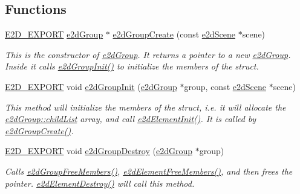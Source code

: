 \subsection*{Functions}
\begin{DoxyCompactItemize}
\item 
\hyperlink{Ez2DS_8h_a9f14e9cb869e1a85fdaba03afcca0df9}{E2\-D\-\_\-\-E\-X\-P\-O\-R\-T} \hyperlink{structe2dGroup}{e2d\-Group} $\ast$ \hyperlink{group__e2dGroup_ga3c7f6acf28180141c87806a9d260f3f9}{e2d\-Group\-Create} (const \hyperlink{structe2dScene}{e2d\-Scene} $\ast$scene)
\begin{DoxyCompactList}\small\item\em This is the constructor of \hyperlink{structe2dGroup}{e2d\-Group}. It returns a pointer to a new \hyperlink{structe2dGroup}{e2d\-Group}. Inside it calls \hyperlink{group__e2dGroup_gafa3f224a6509fbff5063dc910d4e3f1e}{e2d\-Group\-Init()} to initialize the members of the struct. \end{DoxyCompactList}\item 
\hyperlink{Ez2DS_8h_a9f14e9cb869e1a85fdaba03afcca0df9}{E2\-D\-\_\-\-E\-X\-P\-O\-R\-T} void \hyperlink{group__e2dGroup_gafa3f224a6509fbff5063dc910d4e3f1e}{e2d\-Group\-Init} (\hyperlink{structe2dGroup}{e2d\-Group} $\ast$group, const \hyperlink{structe2dScene}{e2d\-Scene} $\ast$scene)
\begin{DoxyCompactList}\small\item\em This method will initialize the members of the struct, i.\-e. it will allocate the \hyperlink{structe2dGroup_a55f6dde874716dc99dcd270fc0999a01}{e2d\-Group\-::child\-List} array, and call \hyperlink{group__e2dElement_ga8734d10ef40a380dfc51bfe1790a92a7}{e2d\-Element\-Init()}. It is called by \hyperlink{group__e2dGroup_ga3c7f6acf28180141c87806a9d260f3f9}{e2d\-Group\-Create()}. \end{DoxyCompactList}\item 
\hyperlink{Ez2DS_8h_a9f14e9cb869e1a85fdaba03afcca0df9}{E2\-D\-\_\-\-E\-X\-P\-O\-R\-T} void \hyperlink{group__e2dGroup_gae2d96b65c911168dd57442f75c632063}{e2d\-Group\-Destroy} (\hyperlink{structe2dGroup}{e2d\-Group} $\ast$group)
\begin{DoxyCompactList}\small\item\em Calls \hyperlink{group__e2dGroup_gae28cbc879651049422f4045988398b6c}{e2d\-Group\-Free\-Members()}, \hyperlink{group__e2dElement_ga5c3a7d29f41609686a3a455bad6ef7c9}{e2d\-Element\-Free\-Members()}, and then frees the pointer. \hyperlink{group__e2dElement_ga2fdc3435e0e1ac9d1e1f0b330d9539fa}{e2d\-Element\-Destroy()} will call this method. \end{DoxyCompactList}\item 

\end{DoxyCompactItemize}
